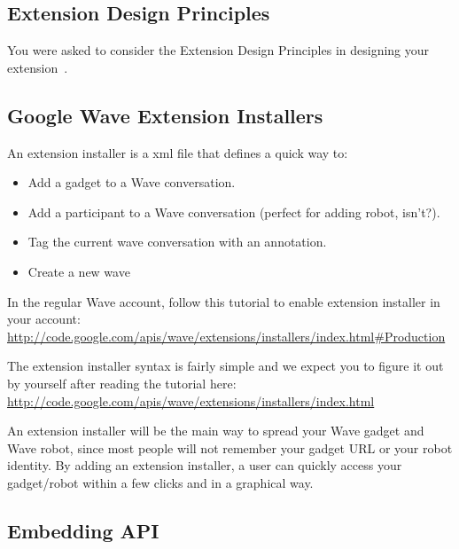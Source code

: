 \subsection{Extension Design Principles}

You were asked to consider the Extension Design Principles in
designing your extension~\cite{googlewave_extension_principles}.


\subsection{Google Wave Extension Installers}

An extension installer is a xml file that defines a quick way to:

\begin{itemize}
\item Add a gadget to a Wave conversation.
\item Add a participant to a Wave conversation (perfect for adding robot, isn't?).
\item Tag the current wave conversation with an annotation.
\item Create a new wave
\end{itemize}

In the regular Wave account, follow this tutorial to enable extension
installer in your
account: \url{http://code.google.com/apis/wave/extensions/installers/index.html#Production}

The extension installer syntax is fairly simple and we expect you to
figure it out by yourself after reading the tutorial
here: \url{http://code.google.com/apis/wave/extensions/installers/index.html}

An extension installer will be the main way to spread your Wave gadget
and Wave robot, since most people will not remember your gadget URL or
your robot identity. By adding an extension installer, a user can
quickly access your gadget/robot within a few clicks and in a
graphical way.


\subsection{Embedding API}

